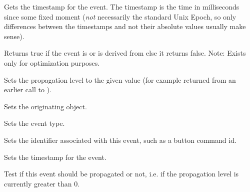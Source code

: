 \label{wxeventgettimestamp}


Gets the timestamp for the event. The timestamp is the time in milliseconds
since some fixed moment (\emph{not} necessarily the standard Unix Epoch, so
only differences between the timestamps and not their absolute values usually
make sense).


\label{wxeventiscommandevent}


Returns true if the event is or is derived from
 else it returns false.
Note: Exists only for optimization purposes.


\label{wxeventresumepropagation}


Sets the propagation level to the given value (for example returned from an
earlier call to ).


\label{wxeventseteventobject}


Sets the originating object.


\label{wxeventseteventtype}


Sets the event type.


\label{wxeventsetid}


Sets the identifier associated with this event, such as a button command id.


\label{wxeventsettimestamp}


Sets the timestamp for the event.


\label{wxeventshouldpropagate}


Test if this event should be propagated or not, i.e. if the propagation level
is currently greater than $0$.


